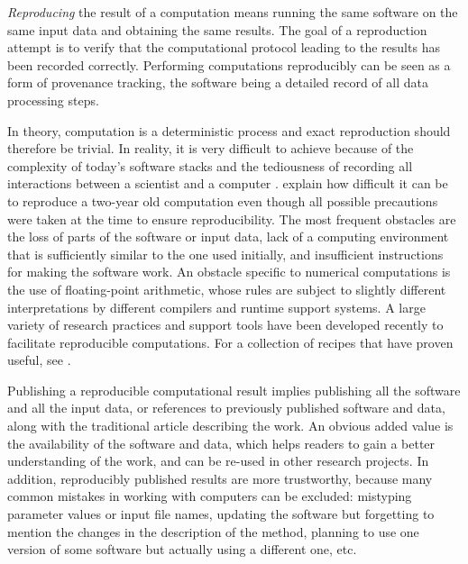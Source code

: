 \documentclass[a4paper,10pt, twocolumn]{article}
\begin{document}
\textit{Reproducing} the result of a computation means running the
same software on the same input data and obtaining the same results.
The goal of a reproduction attempt is to verify that the computational
protocol leading to the results has been recorded correctly.
Performing computations reproducibly can be seen as a form of
provenance tracking, the software being a detailed record of all data
processing steps.

In theory, computation is a deterministic process and exact
reproduction should therefore be trivial. In reality, it is very
difficult to achieve because of the complexity of today's software
stacks and the tediousness of recording all interactions between a
scientist and a computer 
\citep[although a number of recent tools have attempted to automate such recording, e.g.][]{guo:2011, davison:2012, murta:2015}.
\citeauthor{Mesnard:2016} explain
\citep{Mesnard:2016} how difficult it can be to reproduce a two-year
old computation even though all possible precautions were taken at the
time to ensure reproducibility.  The most frequent obstacles are the
loss of parts of the software or input data, lack of a computing
environment that is sufficiently similar to the one used initially,
and insufficient instructions for making the software work. An
obstacle specific to numerical computations is the use of
floating-point arithmetic, whose rules are subject to slightly
different interpretations by different compilers and runtime support
systems. A large variety of research practices and support tools have
been developed recently to facilitate reproducible computations. For a
collection of recipes that have proven useful, see
\citet{kitzes:2017}.

Publishing a reproducible computational result implies publishing all
the software and all the input data, or references to previously
published software and data, along with the traditional article
describing the work. An obvious added value is the availability of the
software and data, which helps readers to gain a better understanding
of the work, and can be re-used in other research projects. In
addition, reproducibly published results are more trustworthy, because
many common mistakes in working with computers can be excluded:
mistyping parameter values or input file names, updating the software
but forgetting to mention the changes in the description of the
method, planning to use one version of some software but actually
using a different one, etc.
\end{document}
